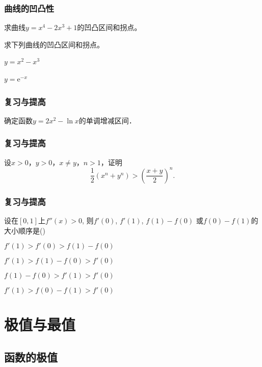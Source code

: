 \documentclass[14pt,notheorems,leqno,xcolor={rgb}]{beamer} %
\begin{document}
\begin{frame}
\frametitle{曲线的凹凸性}
\begin{example}
求曲线$y=x^4-2x^3+1$的凹凸区间和拐点。
\end{example}
\vpause
\begin{exercise}
求下列曲线的凹凸区间和拐点。
\begin{enumhalf}
  \item $y=x^2-x^3$ ~\pause
  \item $y=\mathrm{e}^{-x}$ ~
\end{enumhalf}
\end{exercise}
\end{frame}

\begin{oframe}
\frametitle{复习与提高}
\begin{review}
确定函数$y=2x^2-\ln x$的单调增减区间．
\end{review}
\end{oframe}

\begin{iframe}
\frametitle{复习与提高}
\begin{review}
设$x>0$，$y>0$，$x\neq y$，$n>1$，证明
$$\frac12\left(x^n+y^n\right)>\left(\frac{x+y}{2}\right)^n.$$
\end{review}
\end{iframe}

\begin{frame}
\frametitle{复习与提高}
\begin{choice}
设在$[0,1]$上$f''(x)>0$, 则$f'(0)$, $f'(1)$, $f(1)-f(0)$
或$f(0)-f(1)$的大小顺序是\dotfill(\qquad)
\begin{choiceline}
  \item $f'(1)>f'(0)>f(1)-f(0)$
  \item $f'(1)>f(1)-f(0)>f'(0)$
  \item $f(1)-f (0)>f'(1)>f'(0)$
  \item $f'(1)>f(0)-f(1)>f'(0)$
\end{choiceline} %
\end{choice}
\end{frame}

\section{极值与最值}

\subsection{函数的极值}
\end{document}
